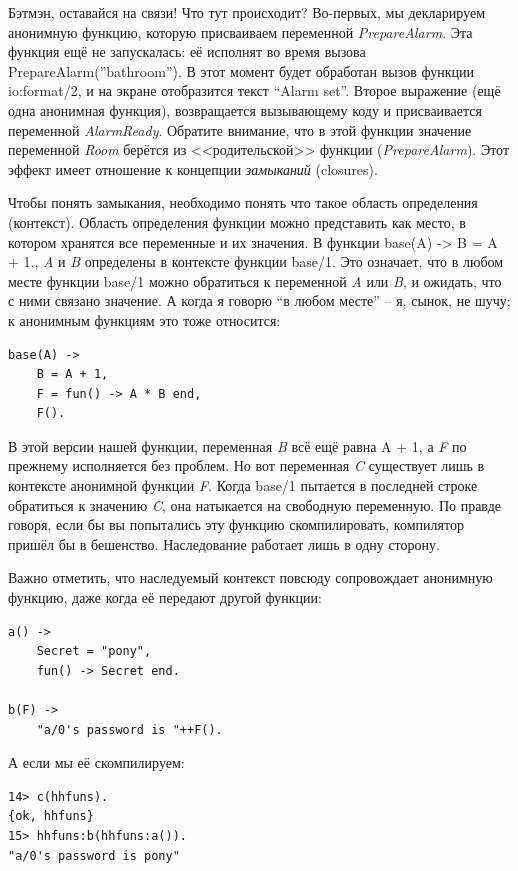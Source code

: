 \documentclass[a4paper,12pt]{report}
\newcommand{\ops}{\colorbox{lgreen}}
\begin{document}
Бэтмэн, оставайся на связи! Что тут происходит? Во\--первых, мы декларируем анонимную функцию, которую присваиваем переменной \emph{PrepareAlarm}. Эта функция ещё не запускалась: её исполнят во время вызова \ops{PrepareAlarm(''bathroom'')}. В этот момент будет обработан вызов функции \ops{io:format/2}, и на экране отобразится текст ``Alarm set''. Второе выражение (ещё одна анонимная функция), возвращается вызывающему коду и присваивается переменной \emph{AlarmReady}. Обратите внимание, что в этой функции значение переменной \emph{Room} берётся из <<родительской>> функции (\emph{PrepareAlarm}). Этот эффект имеет отношение к концепции \emph{замыканий} (closures).

Чтобы понять замыкания, необходимо понять что такое область определения (контекст). Область определения функции можно представить как место, в котором хранятся все переменные и их значения. В функции \ops{base(A) -> B = A + 1.}, \emph{A} и \emph{B} определены в контексте функции \ops{base/1}. Это означает, что в любом месте функции \ops{base/1} можно обратиться к переменной \emph{A} или \emph{B}, и ожидать, что с ними связано значение. А когда я говорю ``в любом месте'' \--- я, сынок, не шучу; к анонимным функциям это тоже относится:
\begin{lstlisting}[style=erlang]
base(A) ->
    B = A + 1,
    F = fun() -> A * B end,
    F().
\end{lstlisting}

В этой версии нашей функции, переменная \emph{B} всё ещё равна \ops{A + 1}, а \emph{F} по прежнему исполняется без проблем. Но вот переменная \emph{C} существует лишь в контексте анонимной функции \emph{F}. Когда \ops{base/1} пытается в последней строке обратиться к значению \emph{C}, она натыкается на свободную переменную. По правде говоря, если бы вы попытались эту функцию скомпилировать, компилятор пришёл бы в бешенство. Наследование работает лишь в одну сторону.

Важно отметить, что наследуемый контекст повсюду сопровождает анонимную функцию, даже когда её передают другой функции:
\begin{lstlisting}[style=erlang]
a() ->
    Secret = "pony",
    fun() -> Secret end.
 
b(F) ->
    "a/0's password is "++F().
\end{lstlisting}

А если мы её скомпилируем:
\begin{lstlisting}[style=erlang]
14> c(hhfuns).
{ok, hhfuns}
15> hhfuns:b(hhfuns:a()).
"a/0's password is pony"
\end{lstlisting}
\end{document}

